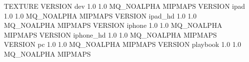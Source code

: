 TEXTURE
{
	VERSION dev			1.0 1.0		MQ_NOALPHA MIPMAPS
	VERSION ipad		1.0 1.0 	MQ_NOALPHA MIPMAPS
	VERSION ipad_hd		1.0 1.0 	MQ_NOALPHA MIPMAPS
	VERSION iphone 		1.0 1.0 	MQ_NOALPHA MIPMAPS
	VERSION iphone_hd	1.0 1.0		MQ_NOALPHA MIPMAPS
	VERSION pc 			1.0 1.0 	MQ_NOALPHA MIPMAPS
	VERSION playbook	1.0 1.0 	MQ_NOALPHA MIPMAPS
}
